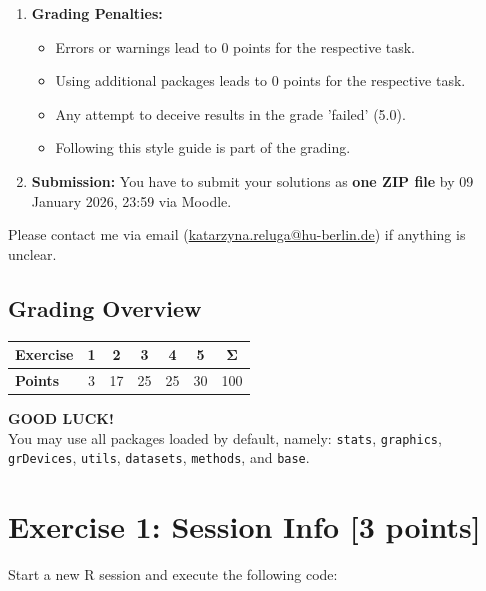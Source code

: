 \documentclass[a4paper,11pt]{article}
\begin{document}
\begin{enumerate}
\begin{itemize}
    \end{itemize}
    \item \textbf{Grading Penalties:}
    \begin{itemize}
        \item Errors or warnings lead to 0 points for the respective task.
        \item Using additional packages leads to 0 points for the respective task.
        \item Any attempt to deceive results in the grade 'failed' (5.0).
        \item Following this style guide is part of the grading.
    \end{itemize}
    \item \textbf{Submission:} You have to submit your solutions as \textbf{one ZIP file} by 09 January 2026, 23:59 via Moodle.
\end{enumerate}

\noindent Please contact me via email (\href{mailto:katarzyna.reluga@hu-berlin.de}{katarzyna.reluga@hu-berlin.de}) if anything is unclear.

\subsection*{Grading Overview}
\begin{center}
\begin{tabular}{lcccccc}
\toprule
\textbf{Exercise} & \textbf{1} & \textbf{2} & \textbf{3} & \textbf{4} & \textbf{5} & $\boldsymbol{\Sigma}$ \\
\midrule
\textbf{Points} & 3 & 17 & 25 & 25 & 30 & 100 \\
\bottomrule
\end{tabular}
\end{center}

\vspace{1cm}
\noindent \textbf{GOOD LUCK!} \\
\small{You may use all packages loaded by default, namely: \texttt{stats}, \texttt{graphics}, \texttt{grDevices}, \texttt{utils}, \texttt{datasets}, \texttt{methods}, and \texttt{base}.}

\newpage

\section*{Exercise 1: Session Info [3 points]}

Start a new R session and execute the following code:
\end{document}
